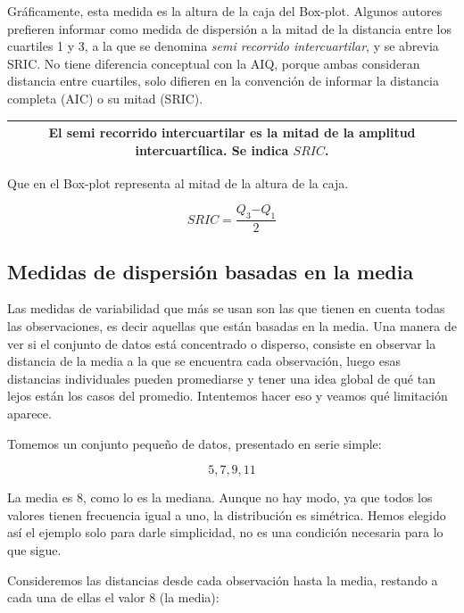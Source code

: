 \documentclass[]{book}
\begin{document}
Gráficamente, esta medida es la altura de la caja del Box-plot. Algunos autores prefieren informar como medida de dispersión a la mitad de la distancia entre los cuartiles 1 y 3, a la que se denomina \emph{semi recorrido intercuartilar}, y se abrevia SRIC. No tiene diferencia conceptual con la AIQ, porque ambas consideran distancia entre cuartiles, solo difieren en la convención de informar la distancia completa (AIC) o su mitad (SRIC).

\begin{longtable}[]{@{}c@{}}
\toprule
\endhead
\begin{minipage}[t]{0.97\columnwidth}\centering
El \textbf{semi recorrido intercuartilar} es la mitad de la amplitud intercuartílica. Se indica \(SRIC\).\strut
\end{minipage}\tabularnewline
\bottomrule
\end{longtable}

Que en el Box-plot representa al mitad de la altura de la caja.

\[SRIC = \frac{Q_{3}{- Q}_{1}}{2}\]

\hypertarget{medidas-de-dispersion-basadas-en-la-media}{%
\subsection{Medidas de dispersión basadas en la media}\label{medidas-de-dispersion-basadas-en-la-media}}

Las medidas de variabilidad que más se usan son las que tienen en cuenta
todas las observaciones, es decir aquellas que están basadas en la
media. Una manera de ver si el conjunto de datos está concentrado o
disperso, consiste en observar la distancia de la media a la que se
encuentra cada observación, luego esas distancias individuales pueden
promediarse y tener una idea global de qué tan lejos están los casos del
promedio. Intentemos hacer eso y veamos qué limitación aparece.

Tomemos un conjunto pequeño de datos, presentado en serie simple:

\[5, 7, 9, 11\]

La media es 8, como lo es la mediana. Aunque no hay modo, ya que todos
los valores tienen frecuencia igual a uno, la distribución es simétrica.
Hemos elegido así el ejemplo solo para darle simplicidad, no es una
condición necesaria para lo que sigue.

Consideremos las distancias desde cada observación hasta la media,
restando a cada una de ellas el valor 8 (la media):
\end{document}
